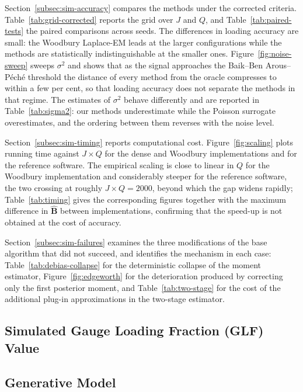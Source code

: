 Section~\ref{subsec:sim-accuracy} compares the methods under the corrected criteria. Table~\ref{tab:grid-corrected} reports the grid over $J$ and $Q$, and Table~\ref{tab:paired-tests} the paired comparisons across seeds. The differences in loading accuracy are small: the Woodbury Laplace-EM leads at the larger configurations while the methods are statistically indistinguishable at the smaller ones. Figure~\ref{fig:noise-sweep} sweeps $\sigma^{2}$ and shows that as the signal approaches the Baik--Ben Arous--P\'ech\'e threshold the distance of every method from the oracle compresses to within a few per cent, so that loading accuracy does not separate the methods in that regime. The estimates of $\sigma^{2}$ behave differently and are reported in Table~\ref{tab:sigma2}: our methods underestimate while the Poisson surrogate overestimates, and the ordering between them reverses with the noise level.

Section~\ref{subsec:sim-timing} reports computational cost. Figure~\ref{fig:scaling} plots running time against $J\times Q$ for the dense and Woodbury implementations and for the reference software. The empirical scaling is close to linear in $Q$ for the Woodbury implementation and considerably steeper for the reference software, the two crossing at roughly $J\times Q=2000$, beyond which the gap widens rapidly; Table~\ref{tab:timing} gives the corresponding figures together with the maximum difference in $\hat{\mathbf{B}}$ between implementations, confirming that the speed-up is not obtained at the cost of accuracy.

Section~\ref{subsec:sim-failures} examines the three modifications of the base algorithm that did not succeed, and identifies the mechanism in each case: Table~\ref{tab:debias-collapse} for the deterministic collapse of the moment estimator, Figure~\ref{fig:edgeworth} for the deterioration produced by correcting only the first posterior moment, and Table~\ref{tab:two-stage} for the cost of the additional plug-in approximations in the two-stage estimator.

\subsection{Simulated Gauge Loading Fraction (GLF) Value}
\label{subsec:sim-glf}

\subsection{Generative Model}
\fi
